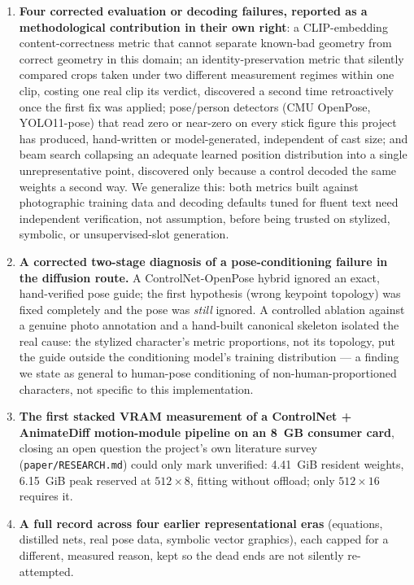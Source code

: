 \documentclass[11pt]{article}
\begin{document}
\begin{enumerate}
\item \textbf{Four corrected evaluation or decoding failures, reported as
  a methodological contribution in their own right}: a CLIP-embedding
  content-correctness metric that cannot separate known-bad geometry from
  correct geometry in this domain; an identity-preservation metric that
  silently compared crops taken under two different measurement regimes
  within one clip, costing one real clip its verdict, discovered a second
  time retroactively once the first fix was applied; pose/person detectors
  (CMU OpenPose, YOLO11-pose) that read zero or near-zero on every stick
  figure this project has produced, hand-written or model-generated,
  independent of cast size; and beam search collapsing an adequate learned
  position distribution into a single unrepresentative point, discovered
  only because a control decoded the same weights a second way. We
  generalize this: both metrics built against photographic training data
  and decoding defaults tuned for fluent text need independent
  verification, not assumption, before being trusted on stylized,
  symbolic, or unsupervised-slot generation.

\item \textbf{A corrected two-stage diagnosis of a pose-conditioning
  failure in the diffusion route.} A ControlNet-OpenPose hybrid ignored an
  exact, hand-verified pose guide; the first hypothesis (wrong keypoint
  topology) was fixed completely and the pose was \emph{still} ignored. A
  controlled ablation against a genuine photo annotation and a hand-built
  canonical skeleton isolated the real cause: the stylized character's
  metric proportions, not its topology, put the guide outside the
  conditioning model's training distribution --- a finding we state as
  general to human-pose conditioning of non-human-proportioned characters,
  not specific to this implementation.

\item \textbf{The first stacked VRAM measurement of a ControlNet +
  AnimateDiff motion-module pipeline on an 8~GB consumer card}, closing an
  open question the project's own literature survey (\texttt{paper/RESEARCH.md})
  could only mark unverified: 4.41~GiB resident weights, 6.15~GiB peak
  reserved at $512\times8$, fitting without offload; only $512\times16$
  requires it.

\item \textbf{A full record across four earlier representational eras}
  (equations, distilled nets, real pose data, symbolic vector graphics),
  each capped for a different, measured reason, kept so the dead ends are
  not silently re-attempted.
\end{enumerate}
\end{document}
